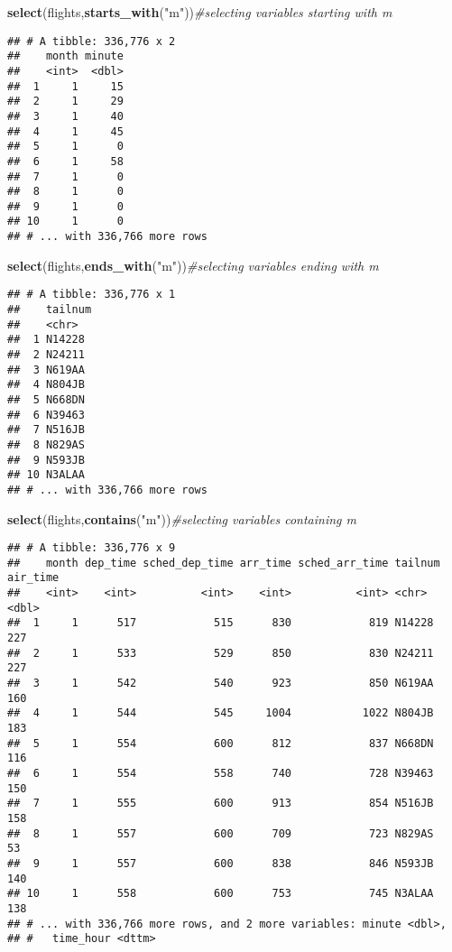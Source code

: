 \documentclass[]{article}
\newenvironment{Shaded}{\begin{snugshade}}{\end{snugshade}}
\newcommand{\CommentTok}[1]{\textcolor[rgb]{0.56,0.35,0.01}{\textit{#1}}}
\newcommand{\KeywordTok}[1]{\textcolor[rgb]{0.13,0.29,0.53}{\textbf{#1}}}
\newcommand{\NormalTok}[1]{#1}
\newcommand{\StringTok}[1]{\textcolor[rgb]{0.31,0.60,0.02}{#1}}
\begin{document}
\begin{Shaded}
\begin{Highlighting}[]
\KeywordTok{select}\NormalTok{(flights,}\KeywordTok{starts_with}\NormalTok{(}\StringTok{"m"}\NormalTok{))}\CommentTok{#selecting variables starting with m}
\end{Highlighting}
\end{Shaded}

\begin{verbatim}
## # A tibble: 336,776 x 2
##    month minute
##    <int>  <dbl>
##  1     1     15
##  2     1     29
##  3     1     40
##  4     1     45
##  5     1      0
##  6     1     58
##  7     1      0
##  8     1      0
##  9     1      0
## 10     1      0
## # ... with 336,766 more rows
\end{verbatim}

\begin{Shaded}
\begin{Highlighting}[]
\KeywordTok{select}\NormalTok{(flights,}\KeywordTok{ends_with}\NormalTok{(}\StringTok{"m"}\NormalTok{))}\CommentTok{#selecting variables ending with m}
\end{Highlighting}
\end{Shaded}

\begin{verbatim}
## # A tibble: 336,776 x 1
##    tailnum
##    <chr>  
##  1 N14228 
##  2 N24211 
##  3 N619AA 
##  4 N804JB 
##  5 N668DN 
##  6 N39463 
##  7 N516JB 
##  8 N829AS 
##  9 N593JB 
## 10 N3ALAA 
## # ... with 336,766 more rows
\end{verbatim}

\begin{Shaded}
\begin{Highlighting}[]
\KeywordTok{select}\NormalTok{(flights,}\KeywordTok{contains}\NormalTok{(}\StringTok{"m"}\NormalTok{))}\CommentTok{#selecting variables containing m}
\end{Highlighting}
\end{Shaded}

\begin{verbatim}
## # A tibble: 336,776 x 9
##    month dep_time sched_dep_time arr_time sched_arr_time tailnum air_time
##    <int>    <int>          <int>    <int>          <int> <chr>      <dbl>
##  1     1      517            515      830            819 N14228       227
##  2     1      533            529      850            830 N24211       227
##  3     1      542            540      923            850 N619AA       160
##  4     1      544            545     1004           1022 N804JB       183
##  5     1      554            600      812            837 N668DN       116
##  6     1      554            558      740            728 N39463       150
##  7     1      555            600      913            854 N516JB       158
##  8     1      557            600      709            723 N829AS        53
##  9     1      557            600      838            846 N593JB       140
## 10     1      558            600      753            745 N3ALAA       138
## # ... with 336,766 more rows, and 2 more variables: minute <dbl>,
## #   time_hour <dttm>
\end{verbatim}
\end{document}
